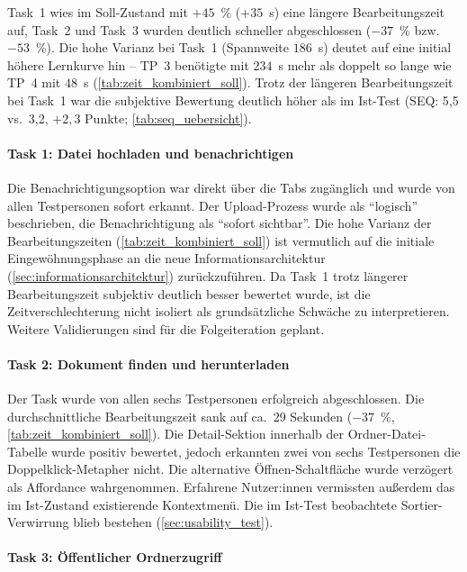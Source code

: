 Task~1 wies im Soll-Zustand mit $+45$~\% ($+35$~s) eine längere Bearbeitungszeit auf, Task~2 und Task~3 wurden deutlich schneller abgeschlossen ($-37$~\% bzw. $-53$~\%). Die hohe Varianz bei Task~1 (Spannweite $186$~s) deutet auf eine initial höhere Lernkurve hin -- TP~3 benötigte mit $234$~s mehr als doppelt so lange wie TP~4 mit $48$~s (\autoref{tab:zeit_kombiniert_soll}). Trotz der längeren Bearbeitungszeit bei Task~1 war die subjektive Bewertung deutlich höher als im Ist-Test (SEQ: 5{,}5 vs.\ 3{,}2, $+2{,}3$ Punkte; \autoref{tab:seq_uebersicht}).

\paragraph{Task 1: Datei hochladen und benachrichtigen}

Die Benachrichtigungsoption war direkt über die Tabs zugänglich und wurde von allen Testpersonen sofort erkannt. Der Upload-Prozess wurde als \enquote{logisch} beschrieben, die Benachrichtigung als \enquote{sofort sichtbar}. Die hohe Varianz der Bearbeitungszeiten (\autoref{tab:zeit_kombiniert_soll}) ist vermutlich auf die initiale Eingewöhnungsphase an die neue Informationsarchitektur (\autoref{sec:informationsarchitektur}) zurückzuführen. Da Task~1 trotz längerer Bearbeitungszeit subjektiv deutlich besser bewertet wurde, ist die Zeitverschlechterung nicht isoliert als grundsätzliche Schwäche zu interpretieren. Weitere Validierungen sind für die Folgeiteration geplant.

\paragraph{Task 2: Dokument finden und herunterladen}

Der Task wurde von allen sechs Testpersonen erfolgreich abgeschlossen. Die durchschnittliche Bearbeitungszeit sank auf ca.~29 Sekunden ($-37$~\%, \autoref{tab:zeit_kombiniert_soll}). Die Detail-Sektion innerhalb der Ordner-Datei-Tabelle wurde positiv bewertet, jedoch erkannten zwei von sechs Testpersonen die Doppelklick-Metapher nicht. Die alternative Öffnen-Schaltfläche wurde verzögert als Affordance wahrgenommen. Erfahrene Nutzer:innen vermissten außerdem das im Ist-Zustand existierende Kontextmenü. Die im Ist-Test beobachtete Sortier-Verwirrung blieb bestehen (\autoref{sec:usability_test}).

\paragraph{Task 3: Öffentlicher Ordnerzugriff}

